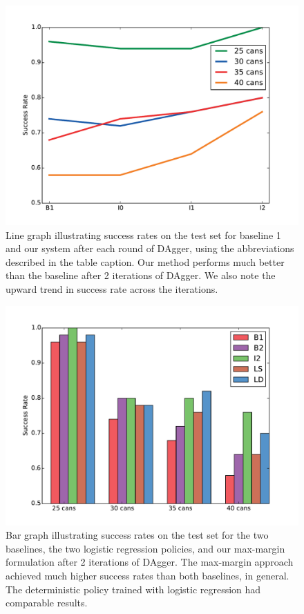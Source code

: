 \begin{figure}[h]
  \centering
    \includegraphics[scale=0.43]{images/results_line}
  \caption{\small{Line graph illustrating success rates on the test set for baseline 1
and our system after each round of DAgger, using the abbreviations described in the
table caption. Our method performs much better than the baseline after 2 iterations of DAgger.
We also note the upward trend in success rate across the iterations.}}
  \label{fig:results_line}
\end{figure}

\begin{figure}[h]
  \centering
    \includegraphics[scale=0.43]{images/results_bar_succ}
  \caption{\small{Bar graph illustrating success rates on the test set for the
two baselines, the two logistic regression policies, and our max-margin formulation after 2 iterations of DAgger. The max-margin approach achieved much higher
success rates than both baselines, in general. The deterministic policy trained with logistic regression had comparable results.}}
  \label{fig:results_bar_succ}
\end{figure}

